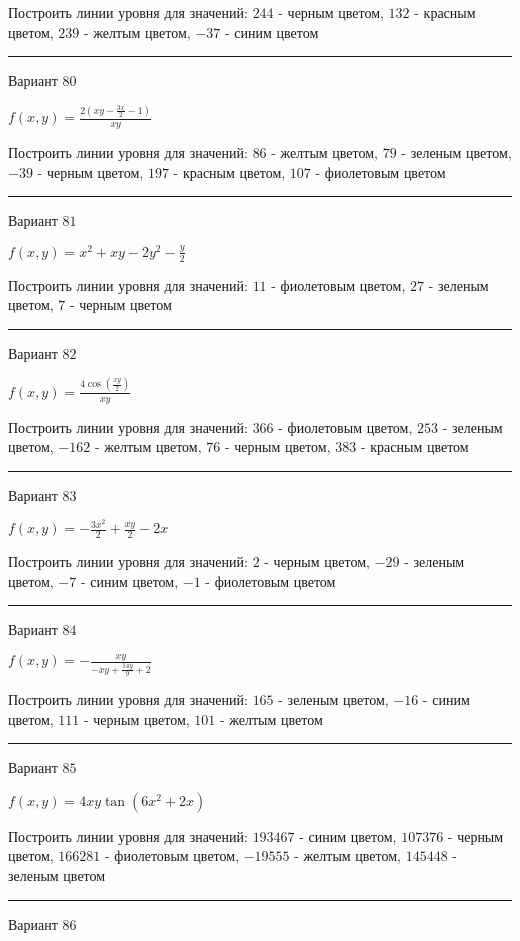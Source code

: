 \documentclass[11pt]{report}
\begin{document}
Построить линии уровня для значений: $244$ - черным цветом, $132$ - красным цветом, $239$ - желтым цветом, $-37$ - синим цветом
\begin{center}
\noindent\rule{8cm}{0.4pt}
\end{center}
Вариант $80$


$f(x, y) = \frac{2 \left(x y - \frac{3 x}{2} - 1\right)}{x y}$

Построить линии уровня для значений: $86$ - желтым цветом, $79$ - зеленым цветом, $-39$ - черным цветом, $197$ - красным цветом, $107$ - фиолетовым цветом
\begin{center}
\noindent\rule{8cm}{0.4pt}
\end{center}
Вариант $81$


$f(x, y) = x^{2} + x y - 2 y^{2} - \frac{y}{2}$

Построить линии уровня для значений: $11$ - фиолетовым цветом, $27$ - зеленым цветом, $7$ - черным цветом
\begin{center}
\noindent\rule{8cm}{0.4pt}
\end{center}
Вариант $82$


$f(x, y) = \frac{4 \cos{\left(\frac{x y}{2} \right)}}{x y}$

Построить линии уровня для значений: $366$ - фиолетовым цветом, $253$ - зеленым цветом, $-162$ - желтым цветом, $76$ - черным цветом, $383$ - красным цветом
\begin{center}
\noindent\rule{8cm}{0.4pt}
\end{center}
Вариант $83$


$f(x, y) = - \frac{3 x^{2}}{2} + \frac{x y}{2} - 2 x$

Построить линии уровня для значений: $2$ - черным цветом, $-29$ - зеленым цветом, $-7$ - синим цветом, $-1$ - фиолетовым цветом
\begin{center}
\noindent\rule{8cm}{0.4pt}
\end{center}
Вариант $84$


$f(x, y) = - \frac{x y}{- x y + \frac{14 y}{9} + 2}$

Построить линии уровня для значений: $165$ - зеленым цветом, $-16$ - синим цветом, $111$ - черным цветом, $101$ - желтым цветом
\begin{center}
\noindent\rule{8cm}{0.4pt}
\end{center}
Вариант $85$


$f(x, y) = 4 x y \tan{\left(6 x^{2} + 2 x \right)}$

Построить линии уровня для значений: $193467$ - синим цветом, $107376$ - черным цветом, $166281$ - фиолетовым цветом, $-19555$ - желтым цветом, $145448$ - зеленым цветом
\begin{center}
\noindent\rule{8cm}{0.4pt}
\end{center}
Вариант $86$
\end{document}
